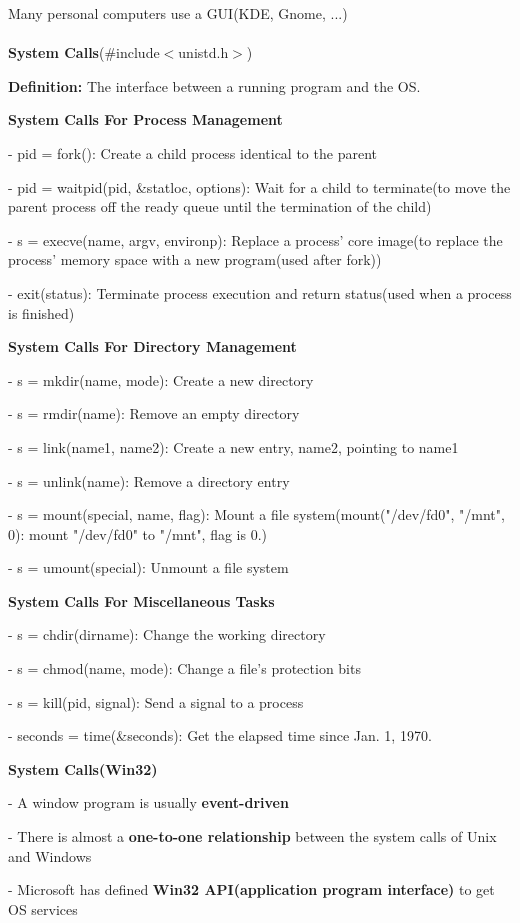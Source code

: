 \documentclass[]{report}
\begin{document}
Many personal computers use a GUI(KDE, Gnome, ...)\\\\
\textbf{System Calls}(\#include$<$unistd.h$>$)

\textbf{Definition:} The interface between a running program and the OS.

\textbf{System Calls For Process Management}

- pid = fork(): Create a child process identical to the parent

- pid = waitpid(pid, \&statloc, options): Wait for a child to terminate(to move the parent process off the ready queue until the termination of the child)

- s = execve(name, argv, environp): Replace a process' core image(to replace the process' memory space with a new program(used after fork))

- exit(status): Terminate process execution and return status(used when a process is finished)

\textbf{System Calls For Directory Management}

- s = mkdir(name, mode): Create a new directory

- s = rmdir(name): Remove an empty directory

- s = link(name1, name2): Create a new entry, name2, pointing to name1

- s = unlink(name): Remove a directory entry

- s = mount(special, name, flag): Mount a file system(mount("/dev/fd0", "/mnt", 0): mount "/dev/fd0" to "/mnt", flag is 0.)

- s = umount(special): Unmount a file system

\textbf{System Calls For Miscellaneous Tasks}

- s = chdir(dirname): Change the working directory

- s = chmod(name, mode): Change a file's protection bits

- s = kill(pid, signal): Send a signal to a process

- seconds = time(\&seconds): Get the elapsed time since Jan. 1, 1970.

\textbf{System Calls(Win32)}

- A window program is usually \textbf{event-driven}

- There is almost a \textbf{one-to-one relationship} between the system calls of Unix and Windows

- Microsoft has defined \textbf{Win32 API(application program interface)} to get OS services
\end{document}
